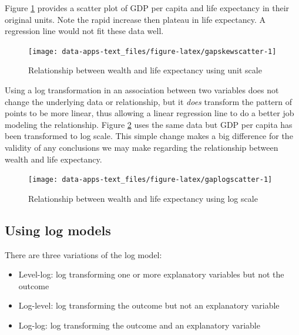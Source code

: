 \documentclass[
]{book}
\providecommand{\tightlist}{%
  \setlength{\itemsep}{0pt}\setlength{\parskip}{0pt}}
\begin{document}
Figure \ref{fig:gapskewscatter} provides a scatter plot of GDP per capita and life expectancy in their original units. Note the rapid increase then plateau in life expectancy. A regression line would not fit these data well.

\begin{figure}

{\centering \texttt{[image: data-apps-text\_files/figure-latex/gapskewscatter-1]} 

}

\caption{Relationship between wealth and life expectancy using unit scale}\label{fig:gapskewscatter}
\end{figure}

Using a log transformation in an association between two variables does not change the underlying data or relationship, but it \emph{does} transform the pattern of points to be more linear, thus allowing a linear regression line to do a better job modeling the relationship. Figure \ref{fig:gaplogscatter} uses the same data but GDP per capita has been transformed to log scale. This simple change makes a big difference for the validity of any conclusions we may make regarding the relationship between wealth and life expectancy.

\begin{figure}

{\centering \texttt{[image: data-apps-text\_files/figure-latex/gaplogscatter-1]} 

}

\caption{Relationship between wealth and life expectancy using log scale}\label{fig:gaplogscatter}
\end{figure}

\hypertarget{using-log-models}{%
\subsection{Using log models}\label{using-log-models}}

There are three variations of the log model:

\begin{itemize}
\tightlist
\item
  Level-log: log transforming one or more explanatory variables but not the outcome
\item
  Log-level: log transforming the outcome but not an explanatory variable
\item
  Log-log: log transforming the outcome and an explanatory variable
\end{itemize}
\end{document}

